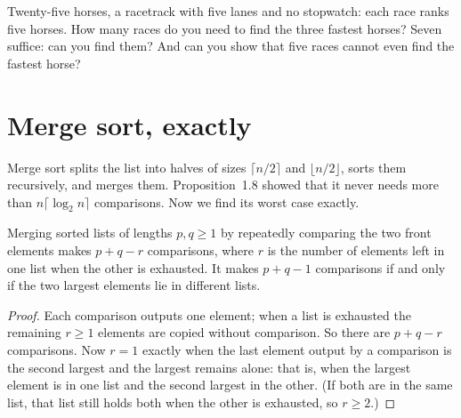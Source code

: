 \begin{think}
Twenty-five horses, a racetrack with five lanes and no stopwatch: each race ranks five horses. How many races do you need to find the
three fastest horses? Seven suffice: can you find them? And can you show that five races cannot even find the fastest horse?
\end{think}

\section{Merge sort, exactly}\label{sec:mergesort}

Merge sort splits the list into halves of sizes $\lceil n/2\rceil$ and $\lfloor n/2\rfloor$, sorts them recursively, and merges them. Proposition~1.8 showed
that it never needs more than $n\lceil\log_2n\rceil$ comparisons. Now we find its worst case exactly.

\begin{lemma}\label{lem:mergecost}
Merging sorted lists of lengths $p,q\ge1$ by repeatedly comparing the two front elements makes $p+q-r$ comparisons, where $r$ is the number of
elements left in one list when the other is exhausted. It makes $p+q-1$ comparisons if and only if the two largest elements lie in
different lists.
\end{lemma}
\begin{proof}
Each comparison outputs one element; when a list is exhausted the remaining $r\ge1$ elements are copied without comparison. So there
are $p+q-r$ comparisons. Now $r=1$ exactly when the last element output by a comparison is the second largest and the largest remains alone:
that is, when the largest element is in one list and the second largest in the other. (If both are in the same list, that list still holds
both when the other is exhausted, so $r\ge2$.)
\end{proof}

